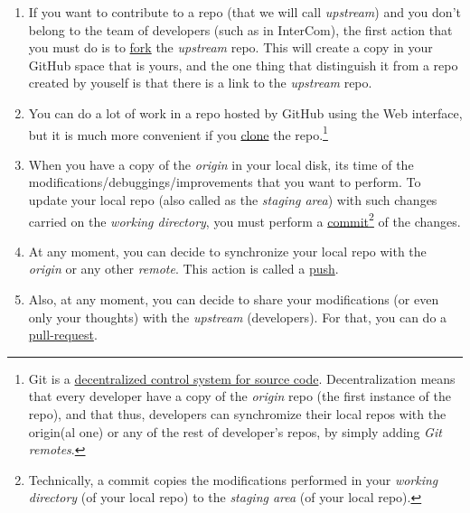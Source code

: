 \begin{enumerate}
\item If you want to contribute to a repo (that we will call
  \emph{upstream}) \cite{Git-workflow} and you don't belong to the
  team of developers (such as in InterCom), the first action that you
  must do is to
  \href{https://docs.github.com/en/github/getting-started-with-github/fork-a-repo}{fork}
  the \emph{upstream} repo. This will create a copy in your GitHub
  space that is yours, and the one thing that distinguish it from a
  repo created by youself is that there is a link to the
  \emph{upstream} repo.
\item You can do a lot of work in a repo hosted by GitHub using the Web
  interface, but it is much more convenient if you
  \href{https://docs.github.com/en/github/creating-cloning-and-archiving-repositories/cloning-a-repository}{clone}
  the repo.\footnote{Git is a
  \href{https://nvie.com/posts/a-successful-git-branching-model/}{decentralized
    control system for source code}. Decentralization means that every
  developer have a copy of the \emph{origin} repo (the first instance
  of the repo), and that thus, developers can synchromize their local
  repos with the origin(al one) or any of the rest of developer's
  repos, by simply adding \emph{Git remotes}.}
\item When you have a copy of the \emph{origin} in your local disk,
  its time of the modifications/debuggings/improvements that you want
  to perform. To update your local repo (also called as the
  \emph{staging area}) with such changes carried on the \emph{working
  directory}, you must perform a
  \href{https://docs.github.com/en/github/getting-started-with-github/github-glossary#commit}{commit}\footnote{Technically,
  a commit copies the modifications performed in your \emph{working
  directory} (of your local repo) to the \emph{staging area} (of your
  local repo).} of the changes.
\item At any moment, you can decide to synchronize your local repo
  with the \emph{origin} or any other \emph{remote}. This action is
  called a
  \href{https://docs.github.com/en/github/using-git/pushing-commits-to-a-remote-repository}{push}.
\item Also, at any moment, you can decide to share your modifications
  (or even only your thoughts) with the \emph{upstream}
  (developers). For that, you can do a
  \href{https://docs.github.com/en/github/collaborating-with-issues-and-pull-requests/about-pull-requests}{pull-request}.
\end{enumerate}

